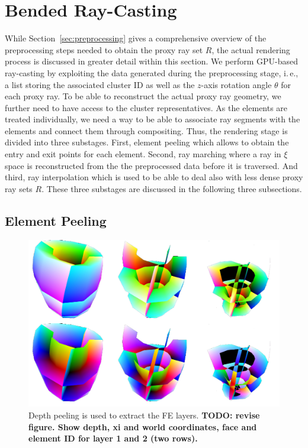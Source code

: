 \documentclass[review,journal]{vgtc}         %
\begin{document}
\section{Bended Ray-Casting}\label{sec:rendering}
While Section~\ref{sec:preprocessing} gives a comprehensive overview of the preprocessing steps needed to obtain the proxy ray set $R$, the actual rendering process is discussed in greater detail within this section. We perform GPU-based ray-casting by exploiting the data generated during the preprocessing stage, i.\,e., a list storing the associated cluster ID as well as the $z$-axis rotation angle $\theta$ for each proxy ray. To be able to reconstruct the actual proxy ray geometry, we further need to have access to the cluster representatives. As the elements are treated individually, we need a way to be able to associate ray segments with the elements and connect them through compositing. Thus, the rendering stage is divided into three substages. First, element peeling which allows to obtain the entry and exit points for each element. Second, ray marching where a ray in $\xi$ space is reconstructed from the the preprocessed data before it is traversed. And third, ray interpolation which is used to be able to deal also with less dense proxy ray sets $R$. These three substages are discussed in the following three subsections.


\subsection{Element Peeling}

\begin{figure}[t]
  \centering 
  \includegraphics[width=0.9\linewidth]{figures/EntryExit}
  \caption{Depth peeling is used to extract the FE layers. \textbf{TODO: revise figure. Show depth, xi and world coordinates, face and element ID for layer 1 and 2 (two rows).}}
  \label{fig:depthpeeling}
\end{figure}
\end{document}
